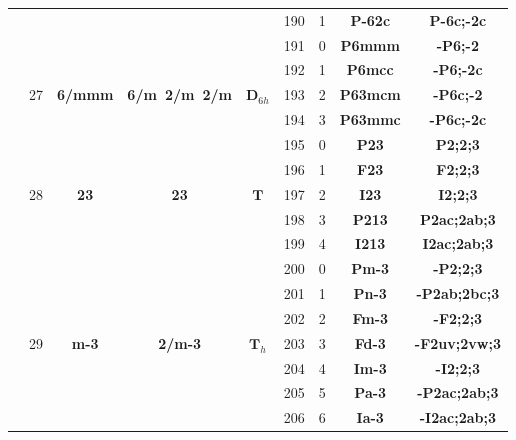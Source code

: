 \documentclass{article}      %
\begin{document}
\begin{small}
\begin{longtable}[c]{|c|c|c|c|c|c|c|c|c|}
          & & & & &\textrm{190}  &\textrm{1} &\textbf{P-62c}       &\textbf{P-6c;-2c}\\\cline{2-9}      
          &  & & & &\textrm{191}  &\textrm{0} &\textbf{P6mmm}       &\textbf{-P6;-2}\\\cline{6-9}        
          &  & & & &\textrm{192}  &\textrm{1} &\textbf{P6mcc}       &\textbf{-P6;-2c}\\\cline{6-9}       
  & \textrm{27} &\textbf{6/mmm} &\textbf{6/m~2/m~2/m} &$\mathbf{D}_{6h}$  &\textrm{193}  &\textrm{2} &\textbf{P63mcm}     &\textbf{-P6c;-2}\\\cline{6-9}        
          &  & & & &\textrm{194}  &\textrm{3} &\textbf{P63mmc}     &\textbf{-P6c;-2c}\\\hline       
 & & & & &\textrm{195} &0 &\textbf{P23} &\textbf{P2;2;3} \\\cline{6-9}
 & & & & &\textrm{196} &1 &\textbf{F23} &\textbf{F2;2;3} \\\cline{6-9}
 & \textrm{28} &\textbf{23} &\textbf{23} &$\mathbf{T}$ &\textrm{197} &2 &\textbf{I23}&\textbf{I2;2;3} \\\cline{6-9}
 & & & & &\textrm{198} &3 &\textbf{P213} &\textbf{P2ac;2ab;3} \\\cline{6-9}
 & & & & &\textrm{199} &4 &\textbf{I213} &\textbf{I2ac;2ab;3} \\\cline{2-9}
 & & & & &\textrm{200} &0 &\textbf{Pm-3} &\textbf{-P2;2;3} \\\cline{6-9}
 & & & & &\textrm{201} &1 &\textbf{Pn-3} &\textbf{-P2ab;2bc;3} \\\cline{6-9}
 & & & & &\textrm{202} &2 &\textbf{Fm-3} &\textbf{-F2;2;3} \\\cline{6-9}
 & \textrm{29} &\textbf{m-3} &\textbf{2/m-3} &$\mathbf{T}_{h}$ &\textrm{203} &3 &\textbf{Fd-3}&\textbf{-F2uv;2vw;3} \\\cline{6-9}
 & & & & &\textrm{204} &4 &\textbf{Im-3} &\textbf{-I2;2;3} \\\cline{6-9}
 & & & & &\textrm{205} &5 &\textbf{Pa-3} &\textbf{-P2ac;2ab;3} \\\cline{6-9}
 & & & & &\textrm{206} &6 &\textbf{Ia-3} &\textbf{-I2ac;2ab;3} \\\cline{2-9}

\end{longtable}
\end{small}
\end{document}
